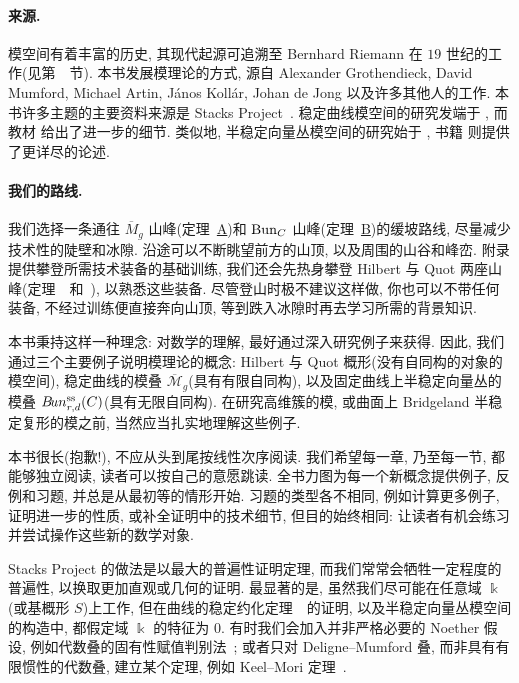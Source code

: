 \paragraph*{来源.} 模空间有着丰富的历史, 其现代起源可追溯至 Bernhard Riemann 在 $19$ 世纪的工作(见第~~节). 本书发展模理论的方式, 源自 Alexander Grothendieck, David Mumford, Michael Artin, János Kollár, Johan de Jong 以及许多其他人的工作. 本书许多主题的主要资料来源是 Stacks Project~\cite{SP}. 稳定曲线模空间的研究发端于 \cite{GIT,DM69}, 而教材 \cite{HM98,ACG11} 给出了进一步的细节. 类似地, 半稳定向量丛模空间的研究始于 \cite{Mum63,Ses67}, 书籍 \cite{LP97,HL10} 则提供了更详尽的论述.

\paragraph*{我们的路线.} 我们选择一条通往 $\overline M_g$ 山峰(定理~\hyperref[thm:A]{A})和 $\operatorname{Bun}_C$ 山峰(定理~\hyperref[thm:B]{B})的缓坡路线, 尽量减少技术性的陡壁和冰隙. 沿途可以不断眺望前方的山顶, 以及周围的山谷和峰峦. 附录提供攀登所需技术装备的基础训练, 我们还会先热身攀登 Hilbert 与 Quot 两座山峰(定理~~和~), 以熟悉这些装备. 尽管登山时极不建议这样做, 你也可以不带任何装备, 不经过训练便直接奔向山顶, 等到跌入冰隙时再去学习所需的背景知识.

本书秉持这样一种理念: 对数学的理解, 最好通过深入研究例子来获得. 因此, 我们通过三个主要例子说明模理论的概念: Hilbert 与 Quot 概形(没有自同构的对象的模空间), 稳定曲线的模叠 $\overline{\mathcal M}_g$(具有有限自同构), 以及固定曲线上半稳定向量丛的模叠 $B\!un_{r,d}^{\mathrm{ss}}(C)$(具有无限自同构). 在研究高维簇的模, 或曲面上 Bridgeland 半稳定复形的模之前, 当然应当扎实地理解这些例子.

本书很长(抱歉!), 不应从头到尾按线性次序阅读. 我们希望每一章, 乃至每一节, 都能够独立阅读, 读者可以按自己的意愿跳读. 全书力图为每一个新概念提供例子, 反例和习题, 并总是从最初等的情形开始. 习题的类型各不相同, 例如计算更多例子, 证明进一步的性质, 或补全证明中的技术细节, 但目的始终相同: 让读者有机会练习并尝试操作这些新的数学对象.

Stacks Project 的做法是以最大的普遍性证明定理, 而我们常常会牺牲一定程度的普遍性, 以换取更加直观或几何的证明. 最显著的是, 虽然我们尽可能在任意域 $\Bbbk$(或基概形 $S$)上工作, 但在曲线的稳定约化定理~~的证明, 以及半稳定向量丛模空间的构造中, 都假定域 $\Bbbk$ 的特征为 $0$. 有时我们会加入并非严格必要的 Noether 假设, 例如代数叠的固有性赋值判别法~; 或者只对 Deligne--Mumford 叠, 而非具有有限惯性的代数叠, 建立某个定理, 例如 Keel--Mori 定理~.

